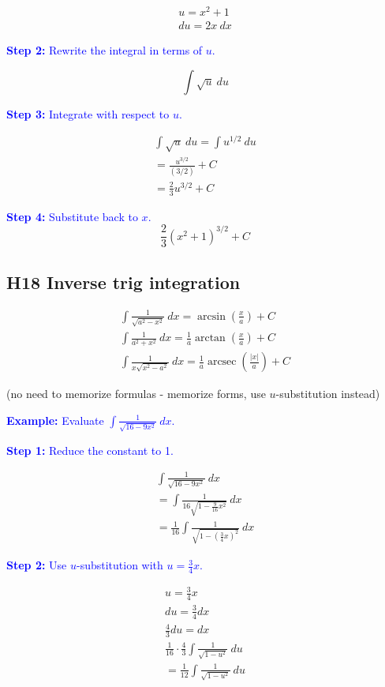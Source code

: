 \documentclass[letterpaper, 12pt]{article}
\DeclareMathOperator{\arcsec}{arcsec}
\newcommand{\example}[1]{\textcolor{blue}{\textbf{Example:} #1}}
\newcommand{\step}[2]{\textcolor{blue}{\textbf{Step #1:} #2}}
\begin{document}
\begin{gather*}
u = x^2 + 1 \\
du = 2x \: dx
\end{gather*}

\step{2}{Rewrite the integral in terms of $u$.}

$$\int \sqrt{u} \: du$$

\step{3}{Integrate with respect to $u$.}

\begin{gather*}
\int \sqrt{u} \: du = \int u^{1/2} \: du \\
= \frac{u^{3/2}}{(3/2)} + C \\
= \frac{2}{3} u^{3/2} + C
\end{gather*}

\step{4}{Substitute back to $x$.}
$$\boxed{\frac{2}{3} (x^2 + 1)^{3/2} + C}$$

\subsection*{H18 Inverse trig integration}

\begin{gather*}
\int \frac{1}{\sqrt{a^2 - x^2}} \: dx = \arcsin \left( \frac{x}{a} \right) + C \\
\int \frac{1}{a^2 + x^2} \: dx = \frac{1}{a} \arctan \left( \frac{x}{a} \right) + C \\
\int \frac{1}{x \sqrt{x^2 - a^2}} \: dx = \frac{1}{a} \arcsec \left( \frac{|x|}{a} \right) + C
\end{gather*}

(no need to memorize formulas - memorize forms, use $u$-substitution instead)

\example{Evaluate $\displaystyle \int \frac{1}{\sqrt{16 - 9x^2}} \: dx$.}

\step{1}{Reduce the constant to 1.}

\begin{gather*}
\int \frac{1}{\sqrt{16 - 9x^2}} \: dx \\
= \int \frac{1}{16\sqrt{1 - \frac{9}{16}x^2}} \: dx \\
= \frac{1}{16} \int \frac{1}{\sqrt{1 - \left(\frac{3}{4}x\right)^2}} \: dx
\end{gather*}

\step{2}{Use $u$-substitution with $u = \frac{3}{4}x$.}

\begin{gather*}
u = \frac{3}{4}x \\
du = \frac{3}{4} dx \\
\frac{4}{3} du = dx \\
\frac{1}{16} \cdot \frac{4}{3} \int \frac{1}{\sqrt{1 - u^2}} \: du \\
= \frac{1}{12} \int \frac{1}{\sqrt{1 - u^2}} \: du
\end{gather*}
\end{document}
